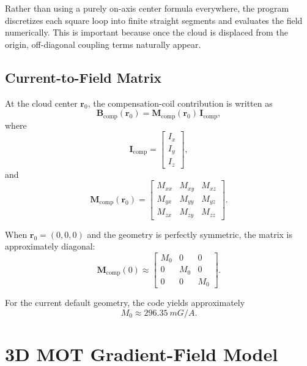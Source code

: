 \documentclass[12pt,a4paper]{article}
\begin{document}
Rather than using a purely on-axis center formula everywhere, the program discretizes each square loop into finite straight segments and evaluates the field numerically. This is important because once the cloud is displaced from the origin, off-diagonal coupling terms naturally appear.

\subsection{Current-to-Field Matrix}

At the cloud center $\bm{r}_0$, the compensation-coil contribution is written as
\begin{equation}
  \bm{B}_{\mathrm{comp}}(\bm{r}_0)
  =
  \bm{M}_{\mathrm{comp}}(\bm{r}_0)\,
  \bm{I}_{\mathrm{comp}},
\end{equation}
where
\begin{equation}
  \bm{I}_{\mathrm{comp}} =
  \begin{bmatrix}
    I_x \\ I_y \\ I_z
  \end{bmatrix},
\end{equation}
and
\begin{equation}
  \bm{M}_{\mathrm{comp}}(\bm{r}_0)
  =
  \begin{bmatrix}
    M_{xx} & M_{xy} & M_{xz} \\
    M_{yx} & M_{yy} & M_{yz} \\
    M_{zx} & M_{zy} & M_{zz}
  \end{bmatrix}.
\end{equation}

When $\bm{r}_0=(0,0,0)$ and the geometry is perfectly symmetric, the matrix is approximately diagonal:
\begin{equation}
  \bm{M}_{\mathrm{comp}}(0) \approx
  \begin{bmatrix}
    M_0 & 0 & 0 \\
    0 & M_0 & 0 \\
    0 & 0 & M_0
  \end{bmatrix}.
\end{equation}

For the current default geometry, the code yields approximately
\begin{equation}
  M_0 \approx \SI{296.35}{mG/A}.
\end{equation}

\section{3D MOT Gradient-Field Model}
\end{document}
